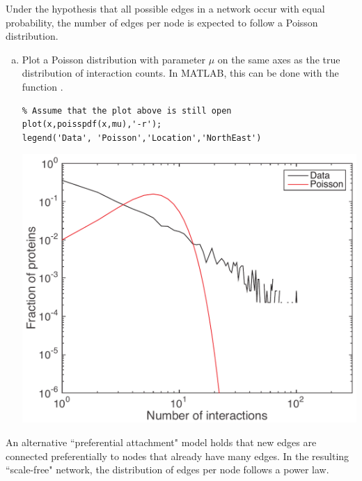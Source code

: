 \documentclass{article}
\begin{document}
Under the hypothesis that all possible edges in a network occur with equal probability, the number of edges per node is expected to follow a Poisson distribution. 
\begin{enumerate}[a)]
\setlength{\itemsep}{0pt}
\setcounter{enumi}{2}
\item Plot a Poisson distribution with parameter $\mu$ on the same axes as the true distribution of interaction counts. In MATLAB, this can be done with the function .\\

\begin{lstlisting}
% Assume that the plot above is still open
plot(x,poisspdf(x,mu),'-r');
legend('Data', 'Poisson','Location','NorthEast')
\end{lstlisting}

\begin{center}\includegraphics[width=0.4 \textwidth]{prob2c.pdf}\end{center}


\end{enumerate}
An alternative ``preferential attachment" model holds that new edges are connected preferentially to nodes that already have many edges. In the resulting ``scale-free" network, the distribution of edges per node follows a power law.
\end{document}
